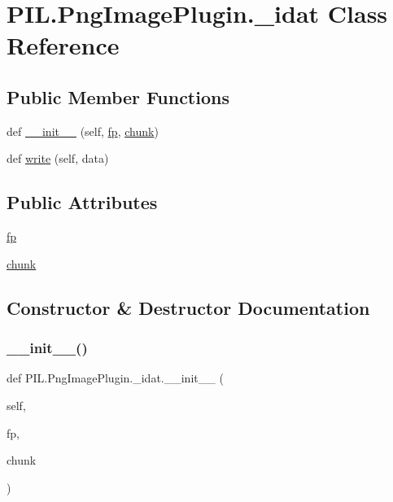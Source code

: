 \hypertarget{classPIL_1_1PngImagePlugin_1_1__idat}{}\section{P\+I\+L.\+Png\+Image\+Plugin.\+\_\+idat Class Reference}
\label{classPIL_1_1PngImagePlugin_1_1__idat}
\subsection*{Public Member Functions}
\begin{DoxyCompactItemize}
\item 
def \hyperlink{classPIL_1_1PngImagePlugin_1_1__idat_aaf41c6ec6c960d9f02799374051241d7}{\+\_\+\+\_\+init\+\_\+\+\_\+} (self, \hyperlink{classPIL_1_1PngImagePlugin_1_1__idat_af4effbfda8f97a0d4164774ce3f78176}{fp}, \hyperlink{classPIL_1_1PngImagePlugin_1_1__idat_a33cfc603fbc488451f68387e7e411daf}{chunk})
\item 
def \hyperlink{classPIL_1_1PngImagePlugin_1_1__idat_a80e7a51272029aff913e328ec703668a}{write} (self, data)
\end{DoxyCompactItemize}
\subsection*{Public Attributes}
\begin{DoxyCompactItemize}
\item 
\hyperlink{classPIL_1_1PngImagePlugin_1_1__idat_af4effbfda8f97a0d4164774ce3f78176}{fp}
\item 
\hyperlink{classPIL_1_1PngImagePlugin_1_1__idat_a33cfc603fbc488451f68387e7e411daf}{chunk}
\end{DoxyCompactItemize}


\subsection{Constructor \& Destructor Documentation}
\mbox{\label{classPIL_1_1PngImagePlugin_1_1__idat_aaf41c6ec6c960d9f02799374051241d7}} 
\subsubsection{\texorpdfstring{\+\_\+\+\_\+init\+\_\+\+\_\+()}{\_\_init\_\_()}}
{\footnotesize\ttfamily def P\+I\+L.\+Png\+Image\+Plugin.\+\_\+idat.\+\_\+\+\_\+init\+\_\+\+\_\+ (\begin{DoxyParamCaption}\item[{}]{self,  }\item[{}]{fp,  }\item[{}]{chunk }\end{DoxyParamCaption})}



